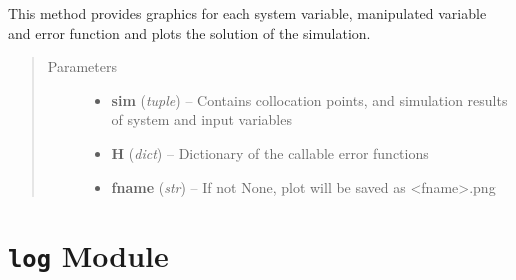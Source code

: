 \documentclass[letterpaper,10pt,english]{sphinxmanual}
\begin{document}
\begin{fulllineitems}
\label{pytrajectory:pytrajectory.utilities.plot}
This method provides graphics for each system variable, manipulated
variable and error function and plots the solution of the simulation.
\begin{quote}\begin{description}
\item[{Parameters}] \leavevmode\begin{itemize}
\item {} 
\textbf{sim} (\emph{tuple}) -- Contains collocation points, and simulation results of system and input variables

\item {} 
\textbf{H} (\emph{dict}) -- Dictionary of the callable error functions

\item {} 
\textbf{fname} (\emph{str}) -- If not None, plot will be saved as \textless{}fname\textgreater{}.png

\end{itemize}

\end{description}\end{quote}

\end{fulllineitems}



\section{\texttt{log} Module}
\label{pytrajectory:module-pytrajectory.log}\label{pytrajectory:log-module}
\end{document}
